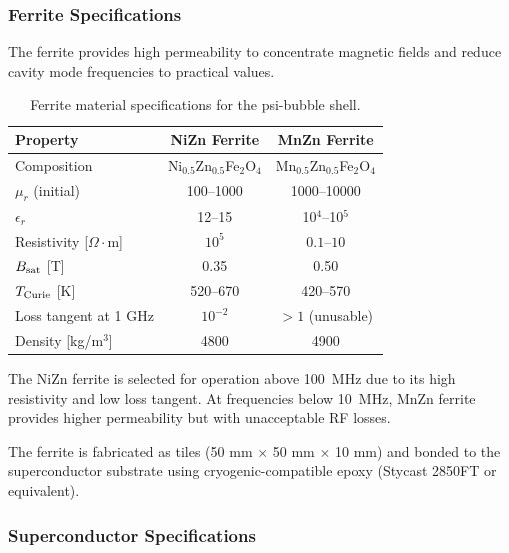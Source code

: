 \documentclass[twocolumn,prl,superscriptaddress,nofootinbib,longbibliography,floatfix]{revtex4-2}
\begin{document}
\subsubsection{Ferrite Specifications}

The ferrite provides high permeability to concentrate magnetic fields and
reduce cavity mode frequencies to practical values.

\begin{table}[h]
\centering
\caption{Ferrite material specifications for the psi-bubble shell.}
\label{tab:ferrite}
\begin{ruledtabular}
\begin{tabular}{lcc}
Property & NiZn Ferrite & MnZn Ferrite \\
\hline
Composition & Ni$_{0.5}$Zn$_{0.5}$Fe$_2$O$_4$ &
Mn$_{0.5}$Zn$_{0.5}$Fe$_2$O$_4$ \\
$\mu_r$ (initial) & 100--1000 & 1000--10000 \\
$\epsilon_r$ & 12--15 & 10$^4$--10$^5$ \\
Resistivity [$\Omega\cdot$m] & $10^5$ & $0.1$--$10$ \\
$B_{\rm sat}$ [T] & 0.35 & 0.50 \\
$T_{\rm Curie}$ [K] & 520--670 & 420--570 \\
Loss tangent at 1 GHz & $10^{-2}$ & $> 1$ (unusable) \\
Density [kg/m$^3$] & 4800 & 4900 \\
\end{tabular}
\end{ruledtabular}
\end{table}

The NiZn ferrite is selected for operation above 100~MHz due to its high
resistivity and low loss tangent.  At frequencies below 10~MHz, MnZn
ferrite provides higher permeability but with unacceptable RF losses.

The ferrite is fabricated as tiles (50 mm $\times$ 50 mm $\times$ 10 mm)
and bonded to the superconductor substrate using cryogenic-compatible
epoxy (Stycast 2850FT or equivalent).

\subsubsection{Superconductor Specifications}
\end{document}
